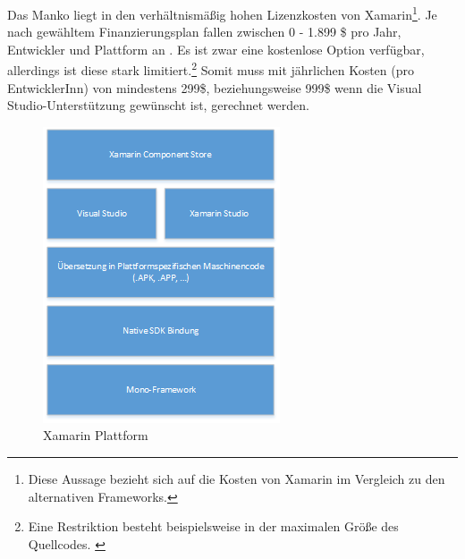 \documentclass[../Bachelorarbeit.tex]{subfiles}
\begin{document}
Das Manko liegt in den verhältnismäßig hohen Lizenzkosten von Xamarin\footnote{Diese Aussage bezieht sich auf die Kosten von Xamarin im Vergleich zu den alternativen Frameworks.}. 
Je nach gewähltem Finanzierungsplan fallen zwischen 0 - 1.899 \$ pro Jahr, Entwickler und Plattform an \parencite[vgl.][] {xamarin_price}. 
Es ist zwar eine kostenlose Option verfügbar, allerdings ist diese stark limitiert.\footnote{Eine Restriktion besteht beispielsweise in der maximalen Größe des Quellcodes. \parencite[vgl.][]{xamarin_price_faq}} 
Somit muss mit jährlichen Kosten (pro EntwicklerInn) von mindestens 299\$, beziehungsweise 999\$ wenn die Visual Studio-Unterstützung gewünscht ist, gerechnet werden.

\begin{figure}
\centering
\includegraphics[width=0.6\linewidth]{./img/XamarinPlattform}
\caption{Xamarin Plattform \parencite[vgl.] [S. 8; Grafik wurde durch Autor angepasst]{xamarin_whitepaper}}
\label{fig:XamarinPlattform}
\end{figure}

\end{document}
